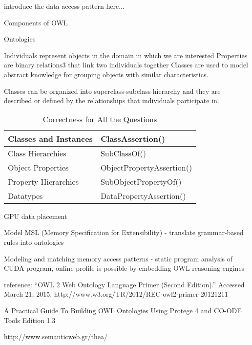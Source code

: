\documentclass{sig-alternate}
\begin{document}
{introduce the data access pattern here...



Components of OWL 

Ontologies

Individuals represent objects in the domain in which we are interested
Properties are binary relations3 that link two individuals together
Classes are used to model abstract knowledge for grouping objects with similar characteristics.

Classes can be organized into superclass-subclass hierarchy and they are described or defined by the relationships that individuals participate in.

\begin{table*}

\centering

\caption{Correctness for All the Questions}

\begin{tabular}{|l|l|} \hline


Classes and Instances&ClassAssertion()\\ \hline
Class Hierarchies&SubClassOf()\\ \hline
Object Properties&ObjectPropertyAssertion()\\ \hline
Property Hierarchies&SubObjectPropertyOf()\\ \hline
Datatypes&DataPropertyAssertion()\\ \hline
\end{tabular}
\label{table:accuracy}
\end{table*}

GPU data placement

Model MSL (Memory Specification for Extensibility) - translate grammar-based rules into ontologies

Modeling and matching memory access patterns - static program analysis of CUDA program, online profile is possible by embedding OWL reasoning engines 

reference: “OWL 2 Web Ontology Language Primer (Second Edition).” Accessed March 21, 2015. http://www.w3.org/TR/2012/REC-owl2-primer-20121211 

A Practical Guide To Building OWL Ontologies Using Protege 4 and CO-ODE Tools Edition 1.3 

http://www.semanticweb.gr/thea/

}
\end{document}
